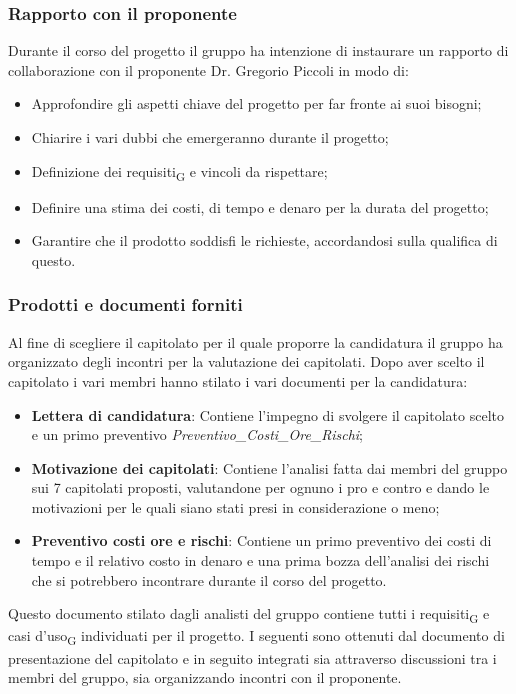 \subsubsection{Rapporto con il proponente}
Durante il corso del progetto il gruppo ha intenzione di instaurare un rapporto di collaborazione con il proponente Dr. Gregorio Piccoli in modo di:
\begin{itemize}
	\item Approfondire gli aspetti chiave del progetto per far fronte ai suoi bisogni;
	\item Chiarire i vari dubbi che emergeranno durante il progetto;
	\item Definizione dei requisiti\textsubscript{G} e vincoli da rispettare;
	\item Definire una stima dei costi, di tempo e denaro per la durata del progetto;
	\item Garantire che il prodotto soddisfi le richieste, accordandosi sulla qualifica di questo.
\end{itemize} 

\subsubsection{Prodotti e documenti forniti}
Al fine di scegliere il capitolato per il quale proporre la candidatura il gruppo ha organizzato degli incontri per la valutazione dei capitolati. Dopo aver scelto il capitolato i vari membri hanno stilato i vari documenti per la candidatura:
\begin{itemize}
	\item \textbf{Lettera di candidatura}: Contiene l'impegno di svolgere il capitolato scelto e un primo preventivo \textit{Preventivo\_Costi\_Ore\_Rischi};
	\item \textbf{Motivazione dei capitolati}: Contiene l'analisi fatta dai membri del gruppo sui 7 capitolati proposti, valutandone per ognuno i pro e contro e dando le motivazioni per le quali siano stati presi in considerazione o meno;
	\item \textbf{Preventivo costi ore e rischi}: Contiene un primo preventivo dei costi di tempo e il relativo costo in denaro e una prima bozza dell'analisi dei rischi che si potrebbero incontrare durante il corso del progetto.
\end{itemize}
Questo documento stilato dagli analisti del gruppo contiene tutti i requisiti\textsubscript{G} e casi d'uso\textsubscript{G} individuati per il progetto. I seguenti sono ottenuti dal documento di presentazione del capitolato e in seguito integrati sia attraverso discussioni tra i membri del gruppo, sia organizzando incontri con il proponente. 
